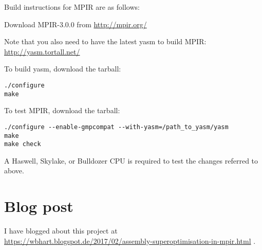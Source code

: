 Build instructions for MPIR are as follows:

Download MPIR-3.0.0 from \url{http://mpir.org/}

Note that you also need to have the latest yasm to build MPIR:
\url{http://yasm.tortall.net/}

To build yasm, download the tarball:

\begin{verbatim}
./configure
make
\end{verbatim}

To test MPIR, download the tarball:

\begin{verbatim}
./configure --enable-gmpcompat --with-yasm=/path_to_yasm/yasm
make
make check
\end{verbatim}

A Haswell, Skylake, or Bulldozer CPU is required to test the changes
referred to above.

\section*{Blog post}\label{blog-post}

I have blogged about this project at
\url{https://wbhart.blogspot.de/2017/02/assembly-superoptimisation-in-mpir.html}
.
